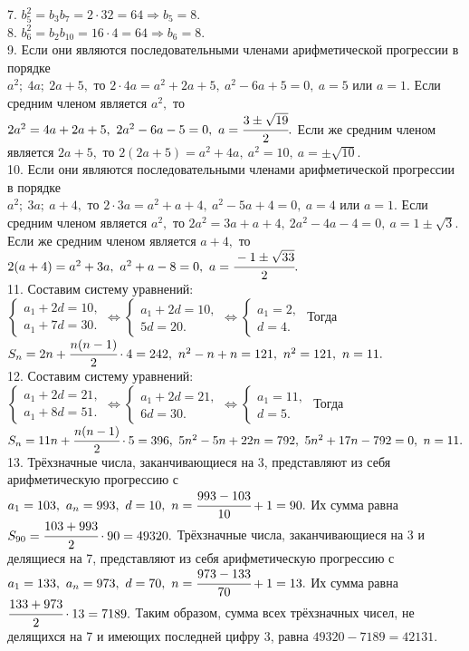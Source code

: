 7. $b_5^2=b_3b_7=2\cdot32=64\Rightarrow b_5=8.$\\
8. $b_6^2=b_2b_{10}=16\cdot4=64\Rightarrow b_6=8.$\\
9. Если они являются последовательными членами арифметической прогрессии в порядке\\ $a^2;\ 4a;\ 2a+5,$ то $2\cdot4a=a^2+2a+5,\ a^2-6a+5=0,\ a=5$ или $a=1.$ Если средним членом является $a^2,$ то $2a^2=4a+2a+5,\ 2a^2-6a-5=0,\ a=\cfrac{3\pm\sqrt{19}}{2}.$ Если же средним членом является $2a+5,$ то $2(2a+5)=a^2+4a,\ a^2=10,\ a=\pm\sqrt{10}.$\\
10. Если они являются последовательными членами арифметической прогрессии в порядке\\ $a^2;\ 3a;\ a+4,$ то $2\cdot3a=a^2+a+4,\ a^2-5a+4=0,\ a=4$ или $a=1.$ Если средним членом является $a^2,$ то $2a^2=3a+a+4,\ 2a^2-4a-4=0,\ a=1\pm\sqrt{3}.$ Если же средним членом является $a+4,$ то $2(a+4)=a^2+3a,\ a^2+a-8=0,\ a=\cfrac{-1\pm\sqrt{33}}{2}.$\\
11. Составим систему уравнений: $\begin{cases}a_1+2d=10,\\a_1+7d=30.\end{cases}\Leftrightarrow\begin{cases}a_1+2d=10,\\5d=20.\end{cases}
\Leftrightarrow\begin{cases}a_1=2,\\d=4.\end{cases}$ Тогда $S_n=2n+\cfrac{n(n-1)}{2}\cdot4=242,\ n^2-n+n=121,\ n^2=121,\ n=11.$\\
12. Составим систему уравнений: $\begin{cases}a_1+2d=21,\\a_1+8d=51.\end{cases}\Leftrightarrow\begin{cases}a_1+2d=21,\\6d=30.\end{cases}
\Leftrightarrow\begin{cases}a_1=11,\\d=5.\end{cases}$ Тогда $S_n=11n+\cfrac{n(n-1)}{2}\cdot5=396,\ 5n^2-5n+22n=792,\ 5n^2+17n-792=0,\ n=11.$\\
13. Трёхзначные числа, заканчивающиеся на 3, представляют из себя арифметическую прогрессию с $a_1=103,\ a_n=993,\ d=10,\ n=\cfrac{993-103}{10}+1=90.$ Их сумма равна $S_{90}=\cfrac{103+993}{2}\cdot90=49320.$ Трёхзначные числа, заканчивающиеся на 3 и делящиеся на 7, представляют из себя арифметическую прогрессию с $a_1=133,\ a_n=973,\ d=70,\ n=\cfrac{973-133}{70}+1=13.$ Их сумма равна $\cfrac{133+973}{2}\cdot13=7189.$ Таким образом, сумма всех трёхзначных чисел, не делящихся на 7 и имеющих последней цифру 3, равна $49320-7189=42131.$\\
